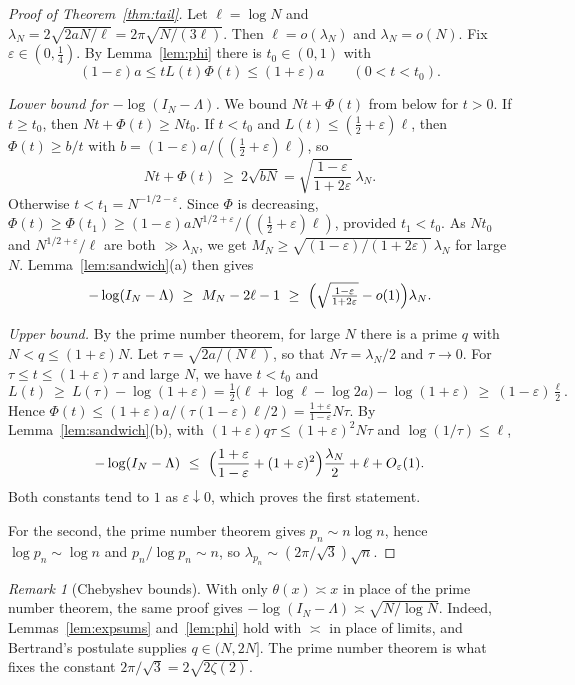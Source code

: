 \documentclass[11pt]{article}
\theoremstyle{remark}
\newtheorem{remark}[theorem]{Remark}
\begin{document}
\begin{proof}[Proof of Theorem~\ref{thm:tail}]
Let $\ell=\log N$ and $\lambda_N=2\sqrt{2aN/\ell}=2\pi\sqrt{N/(3\ell)}$.
Then $\ell=o(\lambda_N)$ and $\lambda_N=o(N)$. Fix
$\varepsilon\in(0,\tfrac14)$. By Lemma~\ref{lem:phi} there is
$t_0\in(0,1)$ with
\[
  (1-\varepsilon)a\le tL(t)\Phi(t)\le(1+\varepsilon)a
  \qquad(0<t<t_0).
\]

\emph{Lower bound for $-\log(I_N-\Lambda)$.} We bound $Nt+\Phi(t)$ from
below for $t>0$. If $t\ge t_0$, then $Nt+\Phi(t)\ge Nt_0$. If $t<t_0$
and $L(t)\le(\tfrac12+\varepsilon)\ell$, then $\Phi(t)\ge b/t$ with
$b=(1-\varepsilon)a/((\tfrac12+\varepsilon)\ell)$, so
\[
  Nt+\Phi(t)\ \ge\ 2\sqrt{bN}
  =\sqrt{\frac{1-\varepsilon}{1+2\varepsilon}}\,\lambda_N .
\]
Otherwise $t<t_1=N^{-1/2-\varepsilon}$. Since $\Phi$ is decreasing,
$\Phi(t)\ge\Phi(t_1)\ge(1-\varepsilon)aN^{1/2+\varepsilon}/((\tfrac12+\varepsilon)\ell)$,
provided $t_1<t_0$. As $Nt_0$ and $N^{1/2+\varepsilon}/\ell$ are both
$\gg\lambda_N$, we get $M_N\ge\sqrt{(1-\varepsilon)/(1+2\varepsilon)}\,\lambda_N$
for large $N$. Lemma~\ref{lem:sandwich}(a) then gives
\[
  -\log(I_N-\Lambda)\ \ge\ M_N-2\ell-1
  \ \ge\ \Bigl(\sqrt{\tfrac{1-\varepsilon}{1+2\varepsilon}}-o(1)\Bigr)\lambda_N .
\]

\emph{Upper bound.} By the prime number theorem, for large $N$ there is
a prime $q$ with $N<q\le(1+\varepsilon)N$. Let $\tau=\sqrt{2a/(N\ell)}$,
so that $N\tau=\lambda_N/2$ and $\tau\to0$. For
$\tau\le t\le(1+\varepsilon)\tau$ and large $N$, we have $t<t_0$ and
\[
  L(t)\ \ge\ L(\tau)-\log(1+\varepsilon)
  =\tfrac12\bigl(\ell+\log\ell-\log2a\bigr)-\log(1+\varepsilon)
  \ \ge\ (1-\varepsilon)\tfrac{\ell}{2}.
\]
Hence
$\Phi(t)\le(1+\varepsilon)a/(\tau(1-\varepsilon)\ell/2)
=\tfrac{1+\varepsilon}{1-\varepsilon}N\tau$. By
Lemma~\ref{lem:sandwich}(b), with $(1+\varepsilon)q\tau\le(1+\varepsilon)^2N\tau$
and $\log(1/\tau)\le\ell$,
\[
  -\log(I_N-\Lambda)\ \le\
  \Bigl(\frac{1+\varepsilon}{1-\varepsilon}+(1+\varepsilon)^2\Bigr)
  \frac{\lambda_N}{2}+\ell+O_\varepsilon(1).
\]
Both constants tend to $1$ as $\varepsilon\downarrow0$, which proves the
first statement.

For the second, the prime number theorem gives $p_n\sim n\log n$, hence
$\log p_n\sim\log n$ and $p_n/\log p_n\sim n$, so
$\lambda_{p_n}\sim(2\pi/\sqrt3)\sqrt n$.
\end{proof}

\begin{remark}[Chebyshev bounds]\label{rem:chebyshev}
With only $\theta(x)\asymp x$ in place of the prime number theorem, the
same proof gives $-\log(I_N-\Lambda)\asymp\sqrt{N/\log N}$. Indeed,
Lemmas~\ref{lem:expsums} and~\ref{lem:phi} hold with $\asymp$ in place of
limits, and Bertrand's postulate supplies $q\in(N,2N]$. The prime number
theorem is what fixes the constant $2\pi/\sqrt3=2\sqrt{2\zeta(2)}$.
\end{remark}
\end{document}
